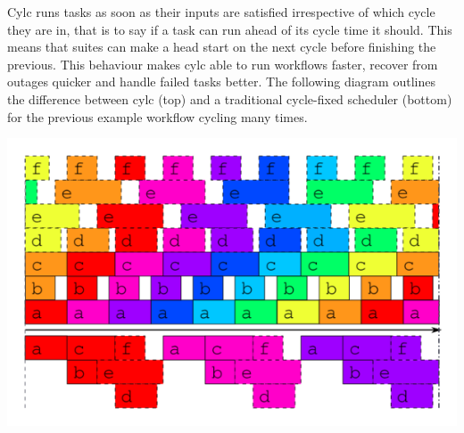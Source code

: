 Cylc runs tasks as soon as their inputs are satisfied irrespective of which
cycle they are in, that is to say if a task can run ahead of its cycle time it
should. This means that suites can make a head start on the next cycle before
finishing the previous. This behaviour makes cylc able to run workflows
faster, recover from outages quicker and handle failed tasks better. The
following diagram outlines the difference between cylc (top) and a traditional
cycle-fixed scheduler (bottom) for the previous example workflow cycling
many times.

\begin{center}
    \includegraphics[width=0.6\columnwidth]{resources/tex/timeline-two}
\end{center}
